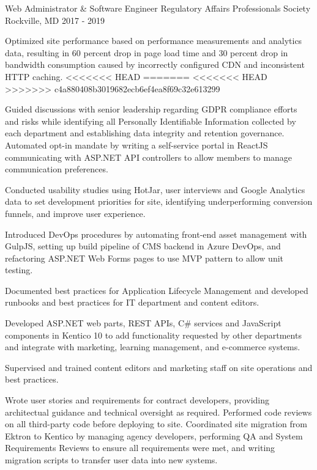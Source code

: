 \begin{cventries}
  \cventry
    {Web Administrator \& Software Engineer} %
    {Regulatory Affairs Professionals Society} %
    {Rockville, MD} %
    {2017 - 2019} %
    {
      \begin{cvitems} %
        \item {Optimized site performance based on performance measurements and analytics data, resulting in 60 percent drop in page load time and 30 percent drop in bandwidth consumption caused by incorrectly configured CDN and inconsistent HTTP caching.}
<<<<<<< HEAD
=======
<<<<<<< HEAD
>>>>>>> c4a880408b3019682ecb6ef4ea8f69c32e613299
        \item {Guided discussions with senior leadership regarding GDPR compliance efforts and risks while identifying all Personally Identifiable Information collected by each department and establishing data integrity and retention governance. Automated opt-in mandate by writing a self-service portal in ReactJS communicating with ASP.NET API controllers to allow members to manage communication preferences.}
        \item {Conducted usability studies using HotJar, user interviews and Google Analytics data to set development priorities for site, identifying underperforming conversion funnels, and improve user experience.}
        \item {Introduced DevOps procedures by automating front-end asset management with GulpJS, setting up build pipeline of CMS backend in Azure DevOps, and refactoring ASP.NET Web Forms pages to use MVP pattern to allow unit testing.}
         \item {Documented best practices for Application Lifecycle Management and developed runbooks and best practices for IT department and content editors.}
         \item {Developed ASP.NET web parts, REST APIs, C\# services and JavaScript components in Kentico 10 to add functionality requested by other departments and integrate with marketing, learning management, and e-commerce systems.}
        \item {Supervised and trained content editors and marketing staff on site operations and best practices.}
        \item {Wrote user stories and requirements for contract developers, providing architectual guidance and technical oversight as required. Performed code reviews on all third-party code before deploying to site. Coordinated site migration from Ektron to Kentico by managing agency developers, performing QA and System Requirements Reviews to ensure all requirements were met, and writing migration scripts to transfer user data into new systems.}

\end{cvitems}}
\end{cventries}
